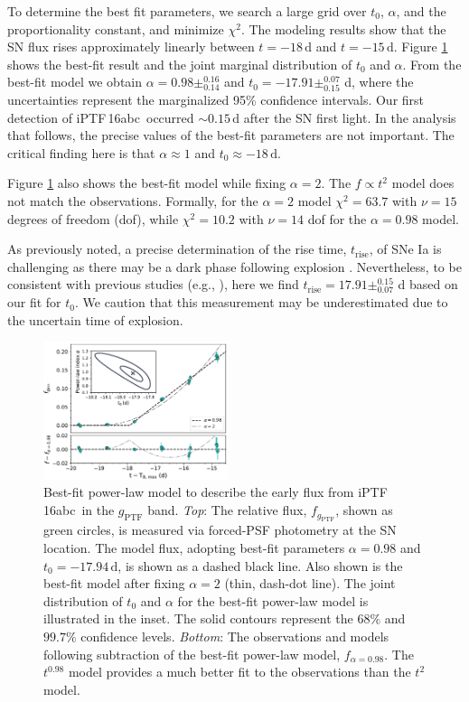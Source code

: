 \documentclass[twocolumn]{aastex61}
\newcommand{\abc}{iPTF\,16abc}
\begin{document}
To determine the best fit parameters, we search a large grid over $t_0$,
$\alpha$, and the proportionality constant, and minimize $\chi^2$. The
modeling results show that the SN flux rises approximately linearly between
$t=-18\,\textrm{d}$ and $t=-15\,\textrm{d}$. Figure \ref{fig:early_lc_fit}
shows the best-fit result and the joint marginal distribution of $t_0$ and
$\alpha$. From the best-fit model we obtain $\alpha=0.98 \pm ^{0.16}_{0.14}$
and $t_0=-17.91 \pm ^{0.07}_{0.15}$ d, where the uncertainties represent the
marginalized 95\% confidence intervals. Our first detection of \abc\ occurred
$\sim$${0.15}\,\textrm{d}$ after the SN first light. In the analysis that
follows, the precise values of the best-fit parameters are not important. The
critical finding here is that $\alpha \approx 1$ and $t_0 \approx -18 \,
\mathrm{d}$.

Figure \ref{fig:early_lc_fit} also shows the best-fit model while fixing
$\alpha = 2$. The $f \propto t^2$ model does not match the observations.
Formally, for the $\alpha = 2$ model $\chi^2 = 63.7$ with $\nu = 15$ degrees
of freedom (dof), while $\chi^2 = 10.2$ with $\nu = 14$ dof for the $\alpha =
0.98$ model.

As previously noted, a precise determination of the rise time,
$t_\mathrm{rise}$, of SNe Ia is challenging as there may be a dark phase
following explosion \citep{2014ApJ...784...85P}. Nevertheless, to be
consistent with previous studies (e.g., \citealt{2011MNRAS.416.2607G}), here
we find $t_\mathrm{rise} = 17.91\pm _{0.07}^{0.15}$ d based on our fit for
$t_0$. We caution that this measurement may be underestimated due to the
uncertain time of explosion.

\begin{figure}[!htb]
  \centering
  \includegraphics[width=0.48\textwidth]{early_lc.pdf}
  \caption{Best-fit power-law model to describe the early flux 
  from \abc\ in the $g_\mathrm{PTF}$ band. \textit{Top}: The 
  relative flux, 
  $f_{g_\mathrm{PTF}}$, shown as green circles, is measured via 
  forced-PSF photometry at the SN location. The model flux, 
  adopting best-fit parameters $\alpha=0.98$ and 
  $t_0=-17.94\,\textrm{d}$, is shown as a dashed black line. Also 
  shown is the best-fit model after fixing 
  $\alpha=2$ (thin, dash-dot line). 
  The joint distribution of $t_0$ and $\alpha$ for the best-fit 
  power-law model is illustrated in the inset. 
  The solid contours represent the $68\%$ and $99.7\%$ confidence 
  levels.
  \textit{Bottom}: 
  The observations and models following 
  subtraction of the best-fit power-law model, $f_{\alpha = 0.98}$.
  The $t^{0.98}$ model provides a much better fit to the 
  observations than the $t^2$ model. 
  }
  \label{fig:early_lc_fit}
\end{figure}
\end{document}
